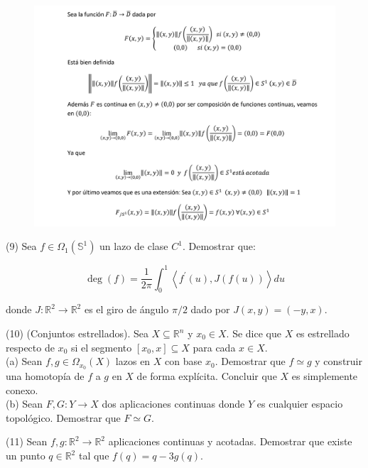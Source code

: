 \documentclass[
  a4paper,
  spanish,
  12pt,
]{scrartcl}
\begin{document}
\begin{figure}[h]
    \centering
    \includegraphics[width=\textwidth]{ej8.png}
    \label{fig:etiqueta}
\end{figure}


\begin{ejer}
(9) Sea $f \in \Omega_{1}\left(\mathbb{S}^{1}\right)$ un lazo de clase $C^{1}$. Demostrar que:

$$
\operatorname{deg}(f)=\frac{1}{2 \pi} \int_{0}^{1}\left\langle f^{\prime}(u), J(f(u))\right\rangle d u
$$

donde $J: \mathbb{R}^{2} \rightarrow \mathbb{R}^{2}$ es el giro de ángulo $\pi / 2$ dado por $J(x, y)=(-y, x)$.\\
\end{ejer}

\begin{ejer}
(10) (Conjuntos estrellados). Sea $X \subseteq \mathbb{R}^{n}$ y $x_{0} \in X$. Se dice que $X$ es estrellado respecto de $x_{0}$ si el segmento $\left[x_{0}, x\right] \subseteq X$ para cada $x \in X$.\\
(a) Sean $f, g \in \Omega_{x_{0}}(X)$ lazos en $X$ con base $x_{0}$. Demostrar que $f \simeq g$ y construir una homotopía de $f$ a $g$ en $X$ de forma explícita. Concluir que $X$ es simplemente conexo.\\
(b) Sean $F, G: Y \rightarrow X$ dos aplicaciones continuas donde $Y$ es cualquier espacio topológico. Demostrar que $F \simeq G$.\\
\end{ejer}

\begin{ejer}
(11) Sean $f, g: \mathbb{R}^{2} \rightarrow \mathbb{R}^{2}$ aplicaciones continuas y acotadas. Demostrar que existe un punto $q \in \mathbb{R}^{2}$ tal que $f(q)=q-3 g(q)$.\\
\end{ejer}
\end{document}
